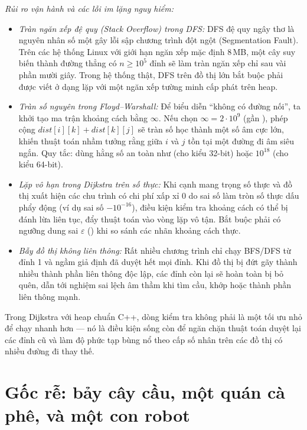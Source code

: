 \documentclass[../../algorithm.tex]{subfiles}
\begin{document}
\emph{Rủi ro vận hành và các lỗi im lặng nguy hiểm:}
\begin{itemize}
\item \emph{Tràn ngăn xếp đệ quy (Stack Overflow) trong DFS:} DFS đệ quy ngây thơ là nguyên nhân số một gây lỗi sập chương trình đột ngột (Segmentation Fault). Trên các hệ thống Linux với giới hạn ngăn xếp mặc định 8\,MB, một cây suy biến thành đường thẳng có \(n \ge 10^5\) đỉnh sẽ làm tràn ngăn xếp chỉ sau vài phần mười giây. Trong hệ thống thật, DFS trên đồ thị lớn bắt buộc phải được viết ở dạng lặp với một ngăn xếp tường minh cấp phát trên heap.
\item \emph{Tràn số nguyên trong Floyd--Warshall:} Để biểu diễn ``không có đường nối'', ta khởi tạo ma trận khoảng cách bằng \(\infty\). Nếu chọn \(\infty = 2\cdot 10^9\) (gần ), phép cộng \(dist[i][k] + dist[k][j]\) sẽ tràn số học thành một số âm cực lớn, khiến thuật toán nhầm tưởng rằng giữa \(i\) và \(j\) tồn tại một đường đi âm siêu ngắn. Quy tắc: dùng hằng số an toàn như  (cho kiểu 32-bit) hoặc \(10^{18}\) (cho kiểu 64-bit).
\item \emph{Lặp vô hạn trong Dijkstra trên số thực:} Khi cạnh mang trọng số thực và đồ thị xuất hiện các chu trình có chi phí xấp xỉ 0 do sai số làm tròn số thực dấu phẩy động (ví dụ sai số \(-10^{-16}\)), điều kiện kiểm tra khoảng cách có thể bị đánh lừa liên tục, đẩy thuật toán vào vòng lặp vô tận. Bắt buộc phải có ngưỡng dung sai \(\varepsilon\) () khi so sánh các nhãn khoảng cách thực.
\item \emph{Bẫy đồ thị không liên thông:} Rất nhiều chương trình chỉ chạy BFS/DFS từ đỉnh 1 và ngầm giả định đã duyệt hết mọi đỉnh. Khi đồ thị bị đứt gãy thành nhiều thành phần liên thông độc lập, các đỉnh còn lại sẽ hoàn toàn bị bỏ quên, dẫn tới nghiệm sai lệch âm thầm khi tìm cầu, khớp hoặc thành phần liên thông mạnh.
\end{itemize}

\begin{cambay}
Trong Dijkstra với heap chuẩn C++, dòng kiểm tra  không phải là một tối ưu nhỏ để chạy nhanh hơn --- nó là điều kiện sống còn để ngăn chặn thuật toán duyệt lại các đỉnh cũ và làm độ phức tạp bùng nổ theo cấp số nhân trên các đồ thị có nhiều đường đi thay thế.
\end{cambay}

\section{Gốc rễ: bảy cây cầu, một quán cà phê, và một con robot}
\end{document}
